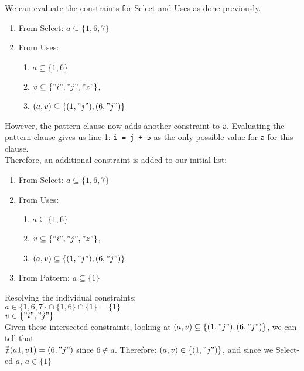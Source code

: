 \documentclass{article}
\begin{document}
We can evaluate the constraints for Select and Uses as done previously. 

\begin{enumerate}
    \item From Select: $a \subseteq \{1, 6, 7\}$
    \item From Uses: 
    \begin{enumerate}
        \item $a \subseteq \{1, 6\}$
        \item $v \subseteq \{"i", "j", "z"\}$, 
        \item $(a, v) \subseteq \{(1, "j"), (6, "j")\}$
    \end{enumerate}
\end{enumerate}

However, the pattern clause now adds another constraint to \texttt{a}. Evaluating the pattern clause gives us line 1: \texttt{i = j + 5} as the only possible value for \texttt{a} for this clause. \\

Therefore, an additional constraint is added to our initial list: 

\begin{enumerate}
    \item From Select: $a \subseteq \{1, 6, 7\}$
    \item From Uses: 
    \begin{enumerate}
        \item $a \subseteq \{1, 6\}$
        \item $v \subseteq \{"i", "j", "z"\}$, 
        \item $(a, v) \subseteq \{(1, "j"), (6, "j")\}$
    \end{enumerate}
    \item From Pattern: $a \subseteq \{1\}$
\end{enumerate}

Resolving the individual constraints: \\
$a \in  \{1, 6, 7\} \cap \{1, 6\} \cap \{1\} = \{1\}$ \\
$v \in \{"i", "j"\}$ \\

Given these intersected constraints, looking at $(a, v) \subseteq \{(1, "j"), (6, "j")\}$, we can tell that \\
$\nexists (a1, v1) = (6, "j")$ since $6 \notin a$. Therefore: $(a, v) \in \{(1, "j")\}$, and since we Select-ed $a$, $a \in \{1\}$ \\
\end{document}
